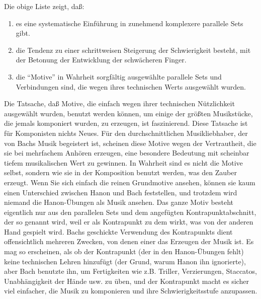 Die obige Liste zeigt, daß:

\begin{enumerate}[label={\roman*.}] 
 \item es eine systematische Einführung in zunehmend komplexere parallele Sets gibt.
 \item die Tendenz zu einer schrittweisen Steigerung der Schwierigkeit besteht, mit der Betonung der Entwicklung der schwächeren Finger.
 \item die \enquote{Motive} in Wahrheit sorgfältig ausgewählte parallele Sets und Verbindungen sind, die wegen ihres technischen Werts ausgewählt wurden.
\end{enumerate}

Die Tatsache, daß Motive, die einfach wegen ihrer technischen Nützlichkeit ausgewählt wurden, benutzt werden können, um einige der größten Musikstücke, die jemals komponiert wurden, zu erzeugen, ist faszinierend.
Diese Tatsache ist für Komponisten nichts Neues.
Für den durchschnittlichen Musikliebhaber, der von Bachs Musik begeistert ist, scheinen diese Motive wegen der Vertrautheit, die sie  bei mehrfachem Anhören erzeugen, eine besondere Bedeutung mit scheinbar tiefem musikalischen Wert zu gewinnen.
In Wahrheit sind es nicht die Motive selbst, sondern wie sie in der Komposition benutzt werden, was den Zauber erzeugt.
Wenn Sie sich einfach die reinen Grundmotive ansehen, können sie kaum einen Unterschied zwischen Hanon und Bach feststellen, und trotzdem wird niemand die Hanon-Übungen als Musik ansehen.
Das ganze Motiv besteht eigentlich nur aus den parallelen Sets und dem angefügten Kontrapunktabschnitt, der so genannt wird, weil er als Kontrapunkt zu dem wirkt, was von der anderen Hand gespielt wird.
Bachs geschickte Verwendung des Kontrapunkts dient offensichtlich mehreren Zwecken, von denen einer das Erzeugen der Musik ist.
Es mag so erscheinen, als ob der Kontrapunkt (der in den Hanon-Übungen fehlt) keine technischen Lehren hinzufügt (der Grund, warum Hanon ihn ignorierte), aber Bach benutzte ihn, um Fertigkeiten wie z.B. Triller, Verzierungen, Staccatos, Unabhängigkeit der Hände usw. zu üben, und der Kontrapunkt macht es sicher viel einfacher, die Musik zu komponieren und ihre Schwierigkeitsstufe anzupassen.

